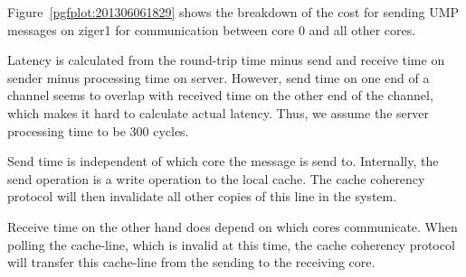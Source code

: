 Figure~\ref{pgfplot:201306061829} shows the breakdown of the cost for
sending UMP messages on ziger1 for communication between core 0 and
all other cores.

Latency is calculated from the round-trip time minus send and receive
time on sender minus processing time on server. However, send time on
one end of a channel seems to overlap with received time on the other
end of the channel, which makes it hard to calculate actual
latency. Thus, we assume the server processing time to be 300 cycles.


Send time is independent of which core the message is send
to. Internally, the send operation is a write operation to the local
cache. The cache coherency protocol will then invalidate all other
copies of this line in the system. 

Receive time on the other hand does depend on which cores
communicate. When polling the cache-line, which is invalid at this
time, the cache coherency protocol will transfer this cache-line from
the sending to the receiving core.

